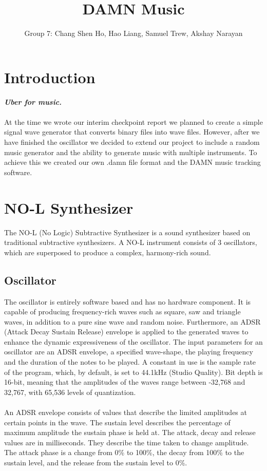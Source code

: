 \documentclass[11pt]{article}
\begin{document}
\title{DAMN Music}
\author{Group 7: Chang Shen Ho, Hao Liang, Samuel Trew, Akshay Narayan}

\maketitle

\section{Introduction}

\textit{\textbf{Uber for music.}}
\\\\
At the time we wrote our interim checkpoint report we planned to create a simple signal wave generator that converts binary files into wave files. However, after we have finished the oscillator we decided to extend our project to include a random music generator and the ability to generate music with multiple instruments. To achieve this we created our own .damn file format and the DAMN music tracking software.

\section{NO-L Synthesizer}
The NO-L (No Logic) Subtractive Synthesizer is a sound synthesizer based on traditional subtractive synthesizers. A NO-L instrument consists of 3 oscillators, which are superposed to produce a complex, harmony-rich sound.
\subsection{Oscillator}
The oscillator is entirely software based and has no hardware component. It is capable of producing frequency-rich waves such as square, saw and triangle waves, in addition to a pure sine wave and random noise. Furthermore, an ADSR (Attack Decay Sustain Release) envelope is applied to the generated waves to enhance the dynamic expressiveness of the oscillator. The input parameters for an oscillator are an ADSR envelope, a specified wave-shape, the playing frequency and the duration of the notes to be played. A constant in use is the sample rate of the program, which, by default, is set to 44.1kHz (Studio Quality). Bit depth is 16-bit, meaning that the amplitudes of the waves range between -32,768 and 32,767, with 65,536 levels of quantization. 
\\\\
An ADSR envelope consists of values that describe the limited amplitudes at certain points in the wave. The sustain level describes the percentage of maximum amplitude the sustain phase is held at. The attack, decay and release values are in milliseconds. They describe the time taken to change amplitude. The attack phase is a change from 0\% to 100\%, the decay from 100\% to the sustain level, and the release from the sustain level to 0\%.
\end{document}
